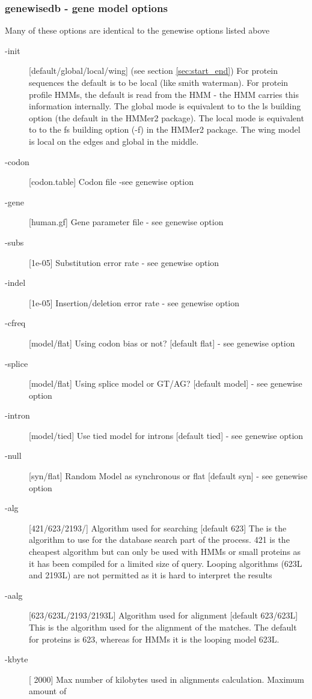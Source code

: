 \documentclass{article}
\begin{document}
\subsubsection{genewisedb - gene model options}
Many of these options are identical to the genewise options
listed above
\begin{description}
\item[-init]   [default/global/local/wing]  (see section \ref{sec:start_end})
For protein sequences the default is to be local (like
smith waterman). For protein profile HMMs, the default is read from the HMM - the
HMM carries this information internally. The global mode is equivalent to to the ls building option
(the default in the HMMer2 package). The local mode is equivalent to to the fs building option (-f)
in the HMMer2 package. The wing model is local on the edges and global in the middle.
\item[-codon]  [codon.table]  Codon file -see genewise option
\item[-gene]   [human.gf]  Gene parameter file - see genewise option
\item[-subs]   [1e-05] Substitution error rate - see genewise option
\item[-indel]  [1e-05] Insertion/deletion error rate - see genewise option
\item[-cfreq]  [model/flat] Using codon bias or not?     [default flat] - see genewise option
\item[-splice] [model/flat] Using splice model or GT/AG? [default model] - see genewise option
\item[-intron] [model/tied] Use tied model for introns   [default tied] - see genewise option
\item[-null]   [syn/flat]   Random Model as synchronous or flat [default syn] - see genewise option
\item[-alg]    [421/623/2193/]            Algorithm used for searching [default 623]
	The is the algorithm to use for the database search part of the process. 421 is the
	cheapest algorithm but can only be used with HMMs or small proteins as it has been compiled
	for a limited size of query. Looping algorithms (623L and 2193L) are not permitted as it is
	hard to interpret the results  
\item[-aalg]   [623/623L/2193/2193L]  Algorithm used for alignment [default 623/623L]
	This is the algorithm used for the alignment of the matches. The default for proteins is
623, whereas for HMMs it is the looping model 623L.
\item[-kbyte]  [ 2000]  Max number of kilobytes used in alignments calculation. Maximum amount of

\end{description}
\end{document}

